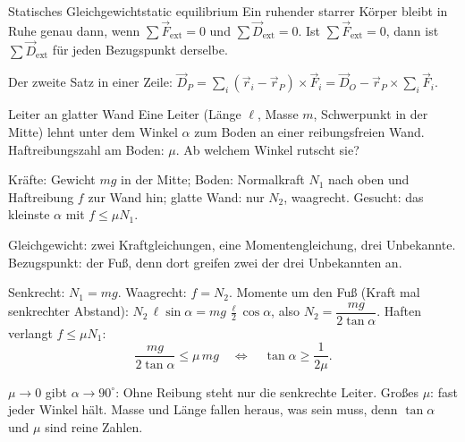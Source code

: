 \documentclass[deutsch]{kaelearn}
\newcommand\ext{_{\mathrm{ext}}}
\newcommand\step[1]{\par\smallskip\noindent{\color{kldim}\pix{#1}}\quad}
\begin{document}
\begin{theorem}{Statisches Gleichgewicht}{static equilibrium}
Ein ruhender starrer Körper bleibt in Ruhe genau dann, wenn $\sum\vec F\ext = 0$ und $\sum\vec D\ext = 0$.
Ist $\sum\vec F\ext = 0$, dann ist $\sum\vec D\ext$ für jeden Bezugspunkt derselbe.
\end{theorem}

Der zweite Satz in einer Zeile: $\vec D_P = \sum_i(\vec r_i-\vec r_P)\times\vec F_i = \vec D_O - \vec r_P\times\sum_i\vec F_i$.


\begin{example}{Leiter an glatter Wand}
Eine Leiter (Länge $\ell$, Masse $m$, Schwerpunkt in der Mitte) lehnt unter dem Winkel $\alpha$ zum Boden an einer reibungsfreien
Wand. Haftreibungszahl am Boden: $\mu$. Ab welchem Winkel rutscht sie?
\begin{center}
\end{center}
\step{Verstehen} Kräfte: Gewicht $mg$ in der Mitte; Boden: Normalkraft $N_1$ nach oben und Haftreibung $f$ zur Wand hin; glatte
Wand: nur $N_2$, waagrecht. Gesucht: das kleinste $\alpha$ mit $f\le\mu N_1$.
\step{Plan} Gleichgewicht: zwei Kraftgleichungen, eine Momentengleichung, drei Unbekannte. Bezugspunkt: der Fuß, denn dort greifen zwei
der drei Unbekannten an.
\step{Rechnung} Senkrecht: $N_1 = mg$. Waagrecht: $f = N_2$. Momente um den Fuß (Kraft mal senkrechter Abstand):
$N_2\,\ell\sin\alpha = mg\,\frac\ell2\cos\alpha$, also $N_2 = \dfrac{mg}{2\tan\alpha}$. Haften verlangt $f\le\mu N_1$:
\[
  \frac{mg}{2\tan\alpha}\le\mu\,mg \quad\Longleftrightarrow\quad \tan\alpha\ge\frac1{2\mu}.
\]
\step{Rückschau} $\mu\to0$ gibt $\alpha\to90^\circ$: Ohne Reibung steht nur die senkrechte Leiter. Großes $\mu$: fast jeder Winkel
hält. Masse und Länge fallen heraus, was sein muss, denn $\tan\alpha$ und $\mu$ sind reine Zahlen.
\end{example}
\end{document}
